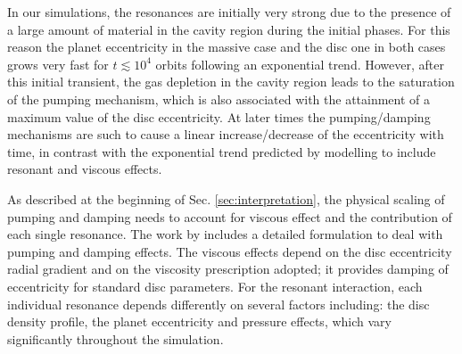 \documentclass[usenatbib,a4paper,times,fleqn]{mnras}
\begin{document}
In our simulations, the resonances are initially very strong due to the presence of a large amount of material in the cavity region during the initial phases. For this reason the planet eccentricity in the massive case and the disc one in both cases grows very fast for $t\lesssim 10^4$ orbits following an exponential trend.  However, after this initial transient, the gas depletion in the cavity region leads to the saturation of the pumping mechanism, which is also associated with the attainment of a maximum value of the disc eccentricity. At later times the pumping/damping mechanisms are such to cause a linear increase/decrease of the eccentricity with time, in contrast with the exponential trend predicted by \citet{zhang2013} modelling to include resonant and viscous effects.

As described at the beginning of Sec. \ref{sec:interpretation}, the physical scaling of pumping and damping needs to account for viscous effect and the contribution of each single resonance.
The work by \citet{teyssandier2016} includes a detailed formulation to deal with pumping and damping effects. The viscous effects depend on the disc eccentricity radial gradient and on the viscosity prescription adopted; it provides damping of eccentricity for standard disc parameters. For the resonant interaction,  each individual resonance depends differently on several factors including: the disc density profile, the planet eccentricity and pressure effects, which vary significantly throughout the simulation.
\end{document}

